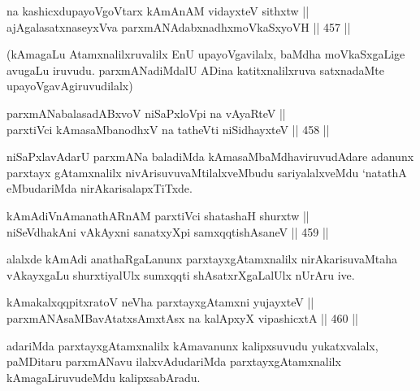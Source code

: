 \begin{shl}
na kashicxdupayoVgoV\s tarx kAmAnAM vidayxteV sithxtw || \\
ajAgalasatxnaseyxVva parxmANAdabxnadhxmoVkaSxyoVH \hfill || 457 ||  
\end{shl}

\begin{artha}
(kAmagaLu Atamxnalilxruvalilx EnU upayoVgavilalx, baMdha moVkaSxgaLige
avugaLu iruvudu. parxmANadiMdalU ADina katitxnalilxruva satxnadaMte upayoVgavAgiruvudilalx)
\end{artha}

\begin{shl}
parxmANabalasadABxvoV niSaPxloV\s pi na vAyaRteV || \\
parxtiVci kAmasaMbanodhxV na tatheVti niSidhayxteV \hfill || 458 ||  
\end{shl}

\begin{artha}
niSaPxlavAdarU parxmANa baladiMda kAmasaMbaMdhaviruvudAdare adanunx
parxtayx gAtamxnalilx nivArisuvuvaMtilalxveMbudu sariyalalxveMdu
`natathA eMbudariMda nirAkarisalapxTiTxde.
\end{artha}


\begin{shl}
kAmAdiVnAmanathARnAM parxtiVci shatashaH shurxtw || \\
niSeVdhakAni vAkAyxni sanatxyXpi samxqqtishAsaneV \hfill || 459 ||  
\end{shl}

\begin{artha}
alalxde kAmAdi anathaRgaLanunx parxtayxgAtamxnalilx nirAkarisuvaMtaha
vAkayxgaLu shurxtiyalUlx sumxqqti shAsatxrXgaLalUlx nUrAru ive.
\end{artha}



\begin{shl}
kAmakalxqqpitxratoV neVha parxtayxgAtamxni yujayxteV || \\
parxmANAsaMBavAtatxsAmxtAsx na kalApxyX vipashicxtA \hfill || 460 ||  
\end{shl}

\begin{artha}
adariMda parxtayxgAtamxnalilx kAmavanunx kalipxsuvudu yukatxvalalx,\break
paMDitaru parxmANavu ilalxvAdudariMda parxtayxgAtamxnalilx
kAmagaLiruvudeMdu kalipxsabAradu.
\end{artha}

